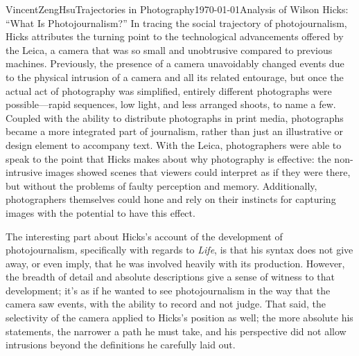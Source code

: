 \documentclass{article}[12pt]
\begin{document}
\begin{mla}{Vincent}{Zeng}{Hsu}{Trajectories in Photography}{\today}{Analysis of Wilson Hicks: ``What Is Photojournalism?''}
	In tracing the social trajectory of photojournalism, Hicks attributes the turning point to the technological advancements offered by the Leica, a camera that was so small and unobtrusive compared to previous machines. Previously, the presence of a camera unavoidably changed events due to the physical intrusion of a camera and all its related entourage, but once the actual act of photography was simplified, entirely different photographs were possible---rapid sequences, low light, and less arranged shoots, to name a few. Coupled with the ability to distribute photographs in print media, photographs became a more integrated part of journalism, rather than just an illustrative or design element to accompany text. With the Leica, photographers were able to speak to the point that Hicks makes about why photography is effective: the non-intrusive images showed scenes that viewers could interpret as if they were there, but without the problems of faulty perception and memory. Additionally, photographers themselves could hone and rely on their instincts for capturing images with the potential to have this effect.
	
	The interesting part about Hicks's account of the development of photojournalism, specifically with regards to \textit{Life}, is that his syntax does not give away, or even imply, that he was involved heavily with its production. However, the breadth of detail and absolute descriptions give a sense of witness to that development; it's as if he wanted to see photojournalism in the way that the camera saw events, with the ability to record and not judge. That said, the selectivity of the camera applied to Hicks's position as well; the more absolute his statements, the narrower a path he must take, and his perspective did not allow intrusions beyond the definitions he carefully laid out.
	
\end{mla}
\end{document}
